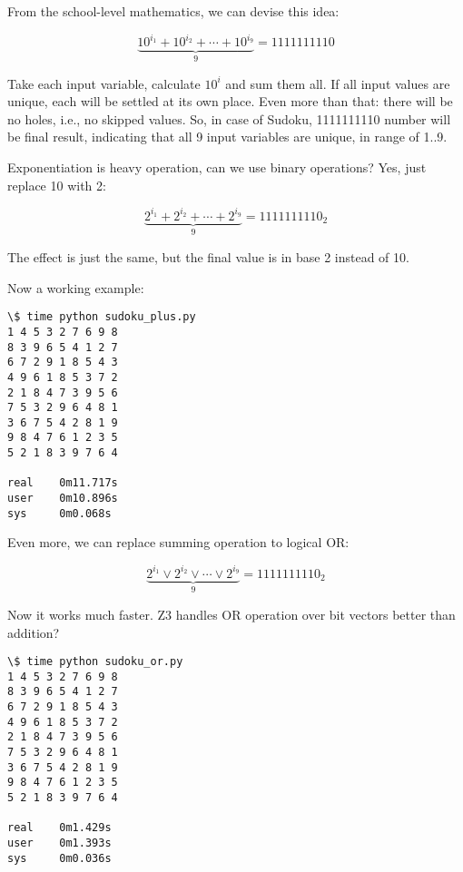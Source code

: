 From the school-level mathematics, we can devise this idea:

\begin{equation}
\underbrace{10^{i_1} + 10^{i_2} + \cdots + 10^{i_9}}_9 = 1111111110
\end{equation}

Take each input variable, calculate $10^i$ and sum them all.
If all input values are unique, each will be settled at its own place.
Even more than that: there will be no holes, i.e., no skipped values.
So, in case of Sudoku, 1111111110 number will be final result, indicating that all 9 input variables are unique, in range of 1..9.

Exponentiation is heavy operation, can we use binary operations? Yes, just replace 10 with 2:

\begin{equation}
\underbrace{2^{i_1} + 2^{i_2} + \cdots + 2^{i_9}}_9 = 1111111110_2
\end{equation}

The effect is just the same, but the final value is in base 2 instead of 10.

Now a working example:



\begin{lstlisting}
\$ time python sudoku_plus.py
1 4 5 3 2 7 6 9 8
8 3 9 6 5 4 1 2 7
6 7 2 9 1 8 5 4 3
4 9 6 1 8 5 3 7 2
2 1 8 4 7 3 9 5 6
7 5 3 2 9 6 4 8 1
3 6 7 5 4 2 8 1 9
9 8 4 7 6 1 2 3 5
5 2 1 8 3 9 7 6 4

real    0m11.717s
user    0m10.896s
sys     0m0.068s
\end{lstlisting}

Even more, we can replace summing operation to logical OR:

\begin{equation}
\underbrace{2^{i_1} \vee 2^{i_2} \vee \cdots \vee 2^{i_9}}_9 = 1111111110_2
\end{equation}



Now it works much faster. Z3 handles OR operation over bit vectors better than addition?

\begin{lstlisting}
\$ time python sudoku_or.py
1 4 5 3 2 7 6 9 8
8 3 9 6 5 4 1 2 7
6 7 2 9 1 8 5 4 3
4 9 6 1 8 5 3 7 2
2 1 8 4 7 3 9 5 6
7 5 3 2 9 6 4 8 1
3 6 7 5 4 2 8 1 9
9 8 4 7 6 1 2 3 5
5 2 1 8 3 9 7 6 4

real    0m1.429s
user    0m1.393s
sys     0m0.036s
\end{lstlisting}

